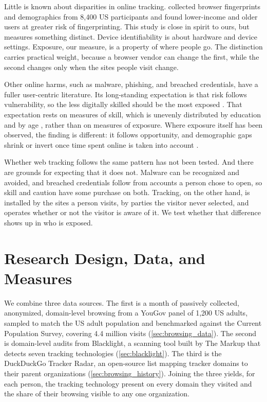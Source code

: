 \documentclass[12pt, letterpaper]{article}
\begin{document}
Little is known about disparities in online tracking. \citet{berke2025whose} collected browser fingerprints and demographics from 8,400 US participants and found lower-income and older users at greater risk of fingerprinting. This study is close in spirit to ours, but measures something distinct. Device identifiability is about hardware and device settings. Exposure, our measure, is a property of where people go.
The distinction carries practical weight, because a browser vendor can change the first, while the second changes only when the sites people visit change.
 
Other online harms, such as malware, phishing, and breached credentials, have a fuller user-centric literature. Its long-standing expectation is that risk follows vulnerability, so the less digitally skilled should be the most exposed \citep{vandeursen2011internet, hadlington2018segmentation, whitty2019predicting}. That expectation rests on measures of skill, which is unevenly distributed by education and by age \citep{vandeursen2011internet}, rather than on measures of exposure. Where exposure itself has been observed, the finding is different: it follows opportunity, and demographic gaps shrink or invert once time spent online is taken into account \citep{simoiu2020targeted, baki2023sixteen, bad_domains, cor2018pwned}.

Whether web tracking follows the same pattern has not been tested. And there are grounds for expecting that it does not. Malware can be recognized and avoided, and breached credentials follow from accounts a person chose to open, so skill and caution have some purchase on both.
Tracking, on the other hand, is installed by the sites a person visits, by parties the visitor never selected, and operates whether or not the visitor is aware of it. We test whether that difference shows up in who is exposed.

\section{Research Design, Data, and Measures}
 
We combine three data sources. The first is a month of passively collected, anonymized, domain-level browsing from a YouGov panel of 1,200 US adults, sampled to match the US adult population and benchmarked against the Current Population Survey, covering 4.4 million visits (\cref{sec:browsing_data}). The second is domain-level audits from Blacklight, a scanning tool built by The Markup that detects seven tracking technologies (\cref{sec:blacklight}). The third is the DuckDuckGo Tracker Radar, an open-source list mapping tracker domains to their parent organizations (\cref{sec:browsing_history}). Joining the three yields, for each person, the tracking technology present on every domain they visited and the share of their browsing visible to any one organization.
\end{document}

